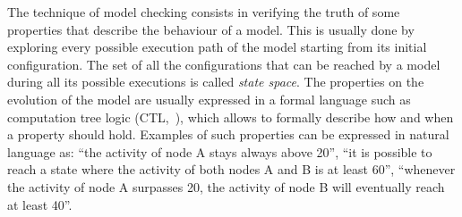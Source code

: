 \documentclass{bmcart}
\begin{document}
The technique of model checking consists in verifying the truth of some properties
that describe the behaviour of a model. This is usually done by exploring every
possible execution path of the model starting from its initial configuration. The set of all
the configurations that can be reached by a model during all its possible executions
is called \emph{state space}. The properties on the evolution of the model are
usually expressed in a formal language such as computation tree logic (CTL,~\cite{ctl}),
which allows to formally describe how and when a property should hold. Examples of such
properties can be expressed in natural language as: ``the activity of node A
stays always above 20'', ``it is possible to reach a state where the activity of both nodes A and B
is at least 60'', ``whenever the activity of node A surpasses 20, the activity of node
B will eventually reach at least 40''.
\end{document}
